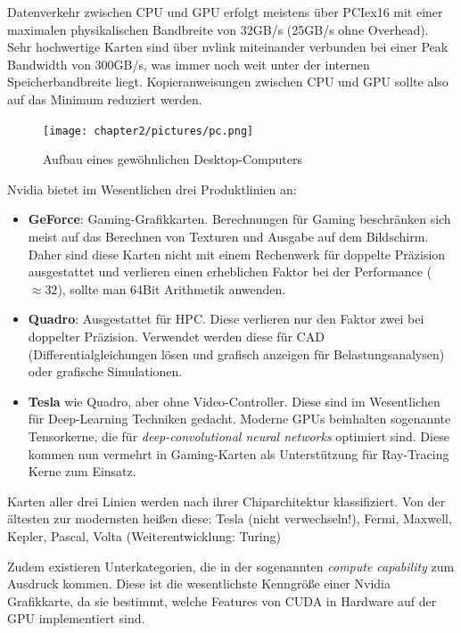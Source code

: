 		Datenverkehr zwischen CPU und GPU erfolgt meistens über \Gls{PCIe}x16 mit einer maximalen physikalischen Bandbreite von 32GB/s (25GB/s ohne Overhead). Sehr hochwertige Karten sind über \gls{nvlink} miteinander verbunden bei einer \Gls{Peak Bandwidth} von 300GB/s, was immer noch weit unter der internen Speicherbandbreite liegt. Kopieranweisungen zwischen CPU und GPU sollte also auf das Minimum reduziert werden.
		
		\begin{figure}[h]
			\centering
    		    \texttt{[image: chapter2/pictures/pc.png]}
    		    \caption[Desktop PC]{Aufbau eines gew\"ohnlichen Desktop-Computers}
    		    \label{2:gpucpu}
		\end{figure}
		
		Nvidia bietet im Wesentlichen drei Produktlinien an:
		\begin{itemize}
		    \item \textbf{GeForce}: Gaming-Grafikkarten. Berechnungen für Gaming beschränken sich meist auf das Berechnen von Texturen und Ausgabe auf dem Bildschirm. Daher sind diese Karten nicht mit einem Rechenwerk für doppelte Präzision ausgestattet und verlieren einen erheblichen Faktor bei der Performance ($\approx 32$), sollte man 64Bit Arithmetik anwenden.
		
		    \item \textbf{Quadro}: Ausgestattet für HPC. Diese verlieren nur den Faktor zwei bei doppelter Präzision. Verwendet werden diese für CAD (Differentialgleichungen lösen und grafisch anzeigen für Belastungsanalysen) oder grafische Simulationen.
		
		    \item \textbf{Tesla} wie Quadro, aber ohne Video-Controller. Diese sind im Wesentlichen für Deep-Learning Techniken gedacht. Moderne GPUs beinhalten sogenannte Tensorkerne, die für \textit{deep-convolutional neural networks} optimiert sind. Diese kommen nun vermehrt in Gaming-Karten als Unterstützung für Ray-Tracing Kerne zum Einsatz.
		\end{itemize}		 		
		
        Karten aller drei Linien werden nach ihrer Chiparchitektur klassifiziert. Von der ältesten zur modernsten heißen diese: Tesla (nicht verwechseln!), Fermi, Maxwell, Kepler, Pascal, Volta (Weiterentwicklung: Turing)
        
        Zudem existieren Unterkategorien, die in der sogenannten \textit{\gls{compute capability}} zum Ausdruck kommen. Diese ist die wesentlichste Kenngröße einer Nvidia Grafikkarte, da sie bestimmt, welche Features von CUDA in Hardware auf der GPU implementiert sind.		
		
